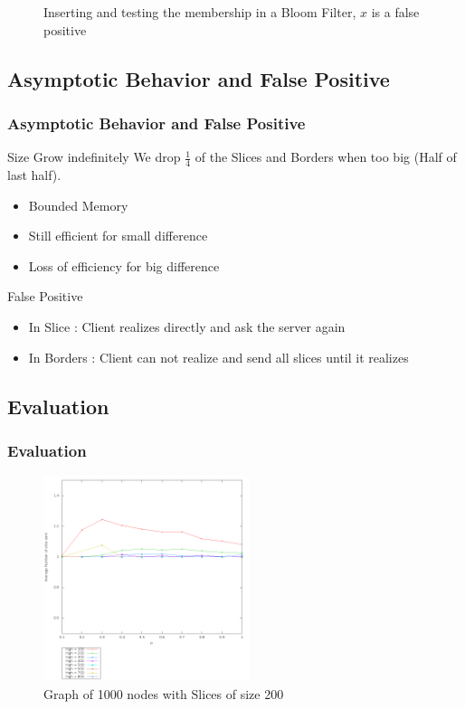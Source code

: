\documentclass[10pt,xcolor={usenames,dvipsnames,svgnames,table}]{beamer}
\theoremstyle{definition}
\theoremstyle{definition}
\begin{document}
\begin{frame}
\begin{figure}[H]
{
}
\caption{Inserting and testing the membership in a Bloom Filter, $x$ is a false positive} \label{fig:fp}
\end{figure}
\end{frame}

\subsection{Asymptotic Behavior and False Positive}
\frametitle{Asymptotic Behavior and False Positive}
\begin{frame}
 \begin{alertblock}{Size Grow indefinitely}
  We drop $\frac{1}{4}$ of the Slices and Borders when too big (Half of last half). 
  \begin{itemize}
   \item Bounded Memory
   \item Still efficient for small difference
   \item Loss of efficiency for big difference
  \end{itemize}
 \end{alertblock}
 \begin{alertblock}{False Positive}
 \begin{itemize}
  \item In Slice : Client realizes directly and ask the server again
  \item In Borders : Client can not realize and send all slices until it realizes
 \end{itemize}

\end{alertblock}
\end{frame}

\subsection{Evaluation}
\begin{frame}
\frametitle{Evaluation}
 \begin{figure}[H]
 \centering
  \includegraphics[height=6cm]{./image/slicesent/Nb_sent_slice.png}
  \caption{Graph of 1000 nodes with Slices of size 200}
 \end{figure}
\end{frame}
\end{document}
